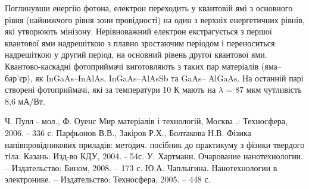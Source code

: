 \documentclass[a4paper,14pt]{extreport}
\begin{document}
Поглинувши енергію фотона, електрон переходить у квантовій ямі
з основного рівня (найнижчого рівня зони провідності) на один з
верхніх енергетичних рівнів, які утворюють мінізону. Нерівноважний
електрон екстрагується з першої квантової ями надрешіткою з плавно
зростаючим періодом і переноситься надрешіткою у другий період, на
основний рівень другої квантової ями.\\ 

Квантово-каскадні фотоприймачі виготовляють з таких пар
матеріалів (яма–бар’єр), як InGaAs–InAlAs, InGaAs–AlAsSb та GaAs–
AlGaAs. На останній парі створені фотоприймачі, які за температури
10 К мають на $\lambda$ = 87 мкм чутливість 8,6 мА/Вт.



























 






\begin{thebibliography}{9}
   Ч. Пулл - мол., Ф. Оуенс Мир матеріалів і технологій, Москва .: Техносфера, 2006. - 336 с.
  Парфьонов В.В., Закіров Р.Х., Болтакова Н.В. Фізика напівпровідникових приладів: методич. посібник до практикуму з фізики твердого тіла. Казань: Изд-во КДУ, 2004. - 54с.
  У. Хартманн. Очарование нанотехнологии. – Издательство: Бином,
2008. – 173 с. 
 Ю.А. Чаплыгина. Нанотехнологии в электронике. – Издательство:
Техносфера, 2005. – 448 с.

\end{thebibliography}
\end{document}
